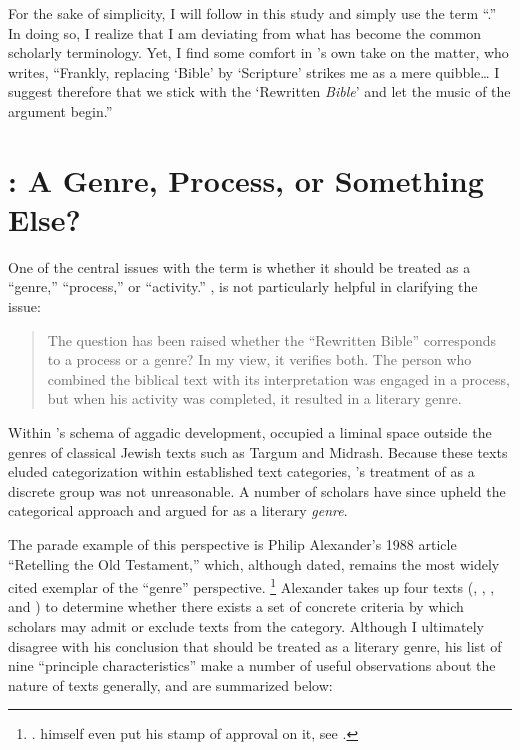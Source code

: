For the sake of simplicity, I will follow \vermes in this study and simply use the term ``\rwb.'' In doing so, I realize that I am deviating from what has become the common scholarly terminology. Yet, I find some comfort in \vermes's own take on the matter, who writes, ``Frankly, replacing `Bible' by `Scripture' strikes me as a mere quibble\ldots{} I suggest therefore that we stick with the `Rewritten \emph{Bible}' and let the music of the argument begin.''%
    \autocite[original emphasis]{vermes_zsengeller2014} 

\section{\rwb: A Genre, Process, or Something Else?}

 One of the central issues with the term \rwb is whether it should be treated as a ``genre,'' ``process,'' or ``activity.'' \vermes, is not particularly helpful in clarifying the issue: 

\begin{quote}
    The question has been raised whether the ``Rewritten Bible'' corresponds to a process or a genre? In my view, it verifies both. The person who combined the biblical text with its interpretation was engaged in a process, but when his activity was completed, it resulted in a literary genre.%
    \autocite[8]{vermes_zsengeller2014}
\end{quote} 
\noindent
Within \vermes's schema of aggadic development, \rwb occupied a liminal space outside the genres of classical Jewish texts such as Targum and Midrash. Because these texts eluded categorization within established text categories, \vermes's treatment of \rwb as a discrete group was not unreasonable. A number of scholars have since upheld the categorical approach and argued for \rwb as a literary \emph{genre}. 

The parade example of this perspective is Philip Alexander's 1988 article ``Retelling the Old Testament,'' which, although dated, remains the most widely cited exemplar of the ``genre'' perspective.%
    \footnote{%
        \Cite{alexander_carson-williamson1988}.
        \vermes himself even put his stamp of approval on it, see
        \cite[4]{vermes_zsengeller2014}.}
Alexander takes up four \rwb texts (\jub, \ga, \lab, and \antiquities) to determine whether there exists a set of concrete criteria by which scholars may admit or exclude texts from the category. Although I ultimately disagree with his conclusion that \rwb should be treated as a literary genre, his list of nine ``principle characteristics'' make a number of useful observations about the nature of \rwb texts generally, and are summarized below: 

